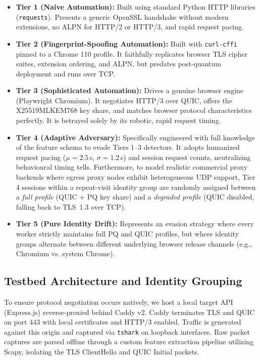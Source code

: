 \documentclass[conference]{IEEEtran}
\begin{document}
\begin{itemize}
    \item \textbf{Tier 1 (Naive Automation):} Built using standard Python HTTP libraries (\texttt{requests}). Presents a generic OpenSSL handshake without modern extensions, no ALPN for HTTP/2 or HTTP/3, and rapid request pacing.
    \item \textbf{Tier 2 (Fingerprint-Spoofing Automation):} Built with \texttt{curl-cffi} pinned to a Chrome 110 profile. It faithfully replicates browser TLS cipher suites, extension ordering, and ALPN, but predates post-quantum deployment and runs over TCP.
    \item \textbf{Tier 3 (Sophisticated Automation):} Drives a genuine browser engine (Playwright Chromium). It negotiates HTTP/3 over QUIC, offers the X25519MLKEM768 key share, and matches browser protocol characteristics perfectly. It is betrayed solely by its robotic, rapid request timing.
    \item \textbf{Tier 4 (Adaptive Adversary):} Specifically engineered with full knowledge of the feature schema to evade Tiers 1--3 detectors. It adopts humanized request pacing ($\mu=2.5$\,s, $\sigma=1.2$\,s) and session request counts, neutralizing behavioural timing tells. Furthermore, to model realistic commercial proxy backends where egress proxy nodes exhibit heterogeneous UDP support, Tier 4 sessions within a repeat-visit identity group are randomly assigned between a \textit{full profile} (QUIC + PQ key share) and a \textit{degraded profile} (QUIC disabled, falling back to TLS~1.3 over TCP).
    \item \textbf{Tier 5 (Pure Identity Drift):} Represents an evasion strategy where every worker strictly maintains full PQ and QUIC profiles, but where identity groups alternate between different underlying browser release channels (e.g., Chromium vs. system Chrome).
\end{itemize}

\subsection{Testbed Architecture and Identity Grouping}
To ensure protocol negotiation occurs natively, we host a local target API (Express.js) reverse-proxied behind Caddy v2. Caddy terminates TLS and QUIC on port 443 with local certificates and HTTP/3 enabled. Traffic is generated against this origin and captured via \texttt{tshark} on loopback interfaces. Raw packet captures are parsed offline through a custom feature extraction pipeline utilizing Scapy, isolating the TLS ClientHello and QUIC Initial packets.
\end{document}
